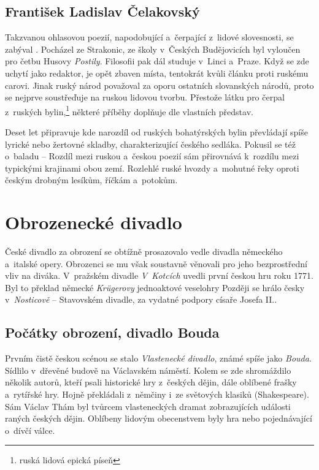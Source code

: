 \subsection*{František Ladislav Čelakovský}
Takzvanou ohlasovou poezií, napodobující a~čerpající z~lidové
slovesnosti, se zabýval . Pocházel
ze Strakonic, ze školy v~Českých Budějovicích byl vyloučen pro četbu
Husovy \emph{Postily}. Filosofii pak dál studuje v~Linci a~Praze. Když
se zde uchytí jako redaktor, je opět zbaven místa, tentokrát kvůli
článku proti ruskému carovi. Jinak ruský národ považoval za oporu
ostatních slovanských národů, proto se nejprve soustřeďuje na ruskou
lidovou tvorbu. Přestože látku pro  čerpal
z~ruských bylin,\footnote{ruská lidová epická píseň} některé příběhy
doplňuje dle vlastních představ.

Deset let připravuje  kde narozdíl od ruských
bohatýrských bylin převládají spíše lyrické nebo žertovné skladby,
charakterizující českého sedláka. Pokusil se též o~baladu -- 
 Rozdíl mezi ruskou a~českou poezií sám
přirovnává k~rozdílu mezi typickými krajinami obou zemí. Rozlehlé ruské
hvozdy a~mohutné řeky oproti českým drobným lesíkům, říčkám a~potokům.

\section{Obrozenecké divadlo
}
České divadlo za obrození se obtížně prosazovalo vedle divadla německého
a~italské opery. Obrozenci se mu však soustavně věnovali pro jeho
bezprostřední vliv na diváka. V~pražském divadle \emph{V~Kotcích} uvedli
první českou hru roku 1771. Byl to překlad německé \emph{Kr\" ugerovy}
jednoaktové veselohry  Později se hrálo česky
v~\emph{Nosticově} -- Stavovském divadle, za vydatné podpory císaře
Josefa II..

\subsection*{Počátky obrození, divadlo Bouda
}
Prvním čistě českou scénou se stalo \emph{Vlastenecké divadlo}, známé
spíše jako \emph{Bouda}. Sídlilo v~dřevěné budově na Václavském náměstí.
Kolem  se zde shromáždilo několik
autorů, kteří psali historické hry z~českých dějin, dále oblíbené frašky
a~rytířské hry. Hojně překládali z~němčiny i~ze světových klasiků
(Shakespeare). Sám Václav Thám byl tvůrcem vlasteneckých dramat
zobrazujících události raných českých dějin. Oblíbeny lidovým
obecenstvem byly hra  nebo  pojednávající o~dívčí válce.

